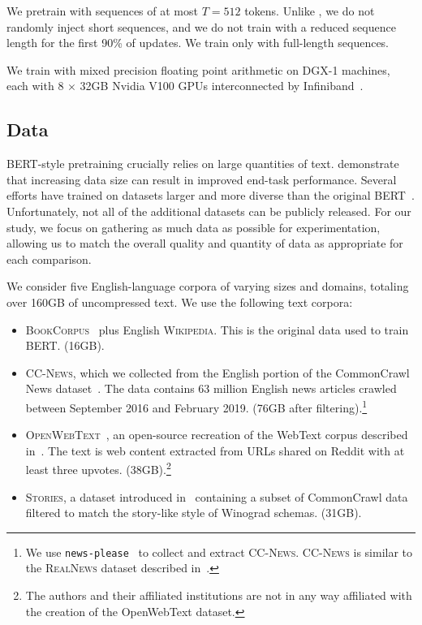 We pretrain with sequences of at most $T=512$ tokens. Unlike , we do not randomly inject short sequences, and we do not train with a reduced sequence length for the first 90\% of updates. We train only with full-length sequences.

We train with mixed precision floating point arithmetic on DGX-1 machines, each with 8 $\times$ 32GB Nvidia V100 GPUs interconnected by Infiniband~\cite{micikevicius2018mixed}.

\subsection{Data} \label{sec:data}

BERT-style pretraining crucially relies on large quantities of text.  demonstrate that increasing data size can result in improved end-task performance. Several efforts have trained on datasets larger and more diverse than the original BERT~\cite{radford2019language,yang2019xlnet,zellers2019neuralfakenews}. Unfortunately, not all of the additional datasets can be publicly released. For our study, we focus on gathering as much data as possible for experimentation, allowing us to match the overall quality and quantity of data as appropriate for each comparison. 

We consider five English-language corpora of varying sizes and domains, totaling over 160GB of uncompressed text. We use the following text corpora:

\begin{itemize}[leftmargin=*]

\item \textsc{BookCorpus}~\cite{moviebook} plus English \textsc{Wikipedia}. This is the original data used to train BERT. (16GB).
\item \textsc{CC-News}, which we collected from the English portion of the CommonCrawl News dataset~\cite{nagel2016ccnews}. The data contains 63 million English news articles crawled between September 2016 and February 2019. (76GB after filtering).\footnote{We use \texttt{news-please}~\cite{hamborg2017newsplease} to collect and extract \textsc{CC-News}. \textsc{CC-News} is similar to the \textsc{RealNews} dataset described in~.}
\item \textsc{OpenWebText}~\cite{gokaslan2019openwebtext}, an open-source recreation of the WebText corpus described in~. The text is web content extracted from URLs shared on Reddit with at least three upvotes. (38GB).\footnote{The authors and their affiliated institutions are not in any way affiliated with the creation of the OpenWebText dataset.}
\item \textsc{Stories}, a dataset introduced in~ containing a subset of CommonCrawl data filtered to match the story-like style of Winograd schemas. (31GB).
\end{itemize}

